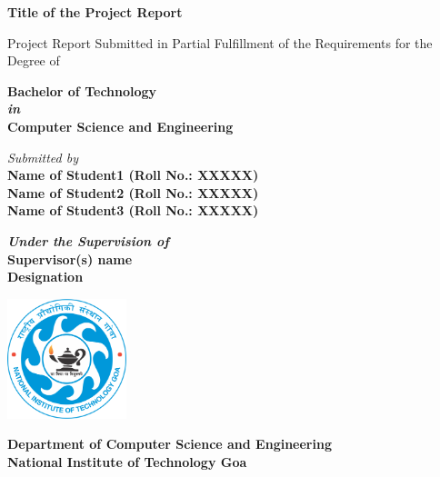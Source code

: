 \documentclass[a4paper,12pt]{report}
\begin{document}
\begin{titlepage}
\begin{center}
       
       \Large {\textbf{Title of the Project Report}
}
        
     \vspace{0.2cm}
     {\footnotesize Project Report Submitted in Partial Fulfillment of the Requirements for the Degree of}\\
     \vspace{0.2cm}
   
    
     \textbf{\Large Bachelor of Technology}\\
 
        \textbf{\textit{in}}\\
           \textbf{\Large Computer Science and Engineering}
           
           \vspace{1cm}
           
           \textit{Submitted by}\\
        \textbf{\large Name of Student1 (Roll No.: XXXXX)}\\
        \textbf{\large Name of Student2 (Roll No.: XXXXX)}\\
        \textbf{\large Name of Student3 (Roll No.: XXXXX)}
        \vspace{1cm}
                
        \centering \large \textbf{\textit{Under the Supervision of}}\\
        \textbf{\large Supervisor(s) name}\\
         \centering\textbf{Designation}
         \vspace{0.5cm}
     
      \includegraphics[width=0.26\textwidth]{images/NIT_Goa_Logo.png}\\
        \vspace{0.2cm}
        
       \textbf{Department of Computer Science and Engineering}\\
       \vspace{0.2cm}
        \textbf{National Institute of Technology Goa}\\
        
 
        \textbf{}
    \end{center} 
\end{titlepage}
\end{document}
